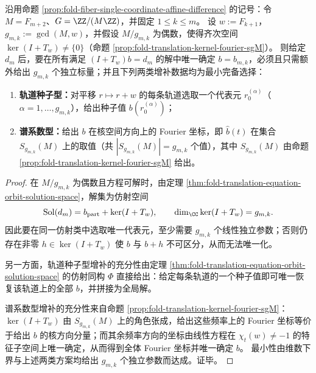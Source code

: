 \begin{proposition}[偶模长下单坐标统计的最小增补信息]\label{prop:fold-fiber-single-coordinate-minimal-augmentation}
沿用命题 \ref{prop:fold-fiber-single-coordinate-affine-difference} 的记号：令 \(M=F_{m+2}\)、\(G=\ZZ/(M\ZZ)\)，并固定 \(1\le k\le m\)。
设 \(w:=F_{k+1}\)，\(g_{m,k}:=\gcd(M,w)\)，并假设 \(M/g_{m,k}\) 为偶数，使得齐次空间 \(\ker(I+T_w)\neq\{0\}\)（命题 \ref{prop:fold-translation-kernel-fourier-sgM}）。
则给定 \(d_m\) 后，要在所有满足 \((I+T_w)b=d_m\) 的解中唯一确定 \(b=b_{m,k}\)，必须且只需额外给出 \(g_{m,k}\) 个独立标量；并且下列两类增补数据均为最小完备选择：
\begin{enumerate}
\normalfont
  \item \textbf{轨道种子型：}对平移 \(r\mapsto r+w\) 的每条轨道选取一个代表元 \(r_0^{(\alpha)}\)（\(\alpha=1,\dots,g_{m,k}\)），给出种子值 \(b(r_0^{(\alpha)})\)；
  \item \textbf{谱系数型：}给出 \(b\) 在核空间方向上的 Fourier 坐标，即 \(\widehat b(t)\) 在集合 \(S_{g_{m,k}}(M)\) 上的取值（共 \(|S_{g_{m,k}}(M)|=g_{m,k}\) 个值），其中 \(S_{g_{m,k}}(M)\) 由命题 \ref{prop:fold-translation-kernel-fourier-sgM} 给出。
\end{enumerate}
\end{proposition}

\begin{proof}
在 \(M/g_{m,k}\) 为偶数且方程可解时，由定理 \ref{thm:fold-translation-equation-orbit-solution-space}，解集为仿射空间
\[
\mathrm{Sol}(d_m)=b_{\mathrm{part}}+\ker(I+T_w),
\qquad
\dim_{\CC}\ker(I+T_w)=g_{m,k}.
\]
因此要在同一仿射类中选取唯一代表元，至少需要 \(g_{m,k}\) 个线性独立参数；否则仍存在非零 \(h\in\ker(I+T_w)\) 使 \(b\) 与 \(b+h\) 不可区分，从而无法唯一化。
\par
另一方面，轨道种子型增补的充分性由定理 \ref{thm:fold-translation-equation-orbit-solution-space} 的仿射同构 \(\Phi\) 直接给出：给定每条轨道的一个种子值即可唯一恢复该轨道上的全部 \(b\)，并拼接为全局解。
\par
谱系数型增补的充分性来自命题 \ref{prop:fold-translation-kernel-fourier-sgM}：\(\ker(I+T_w)\) 由 \(S_{g_{m,k}}(M)\) 上的角色张成，给出这些频率上的 Fourier 坐标等价于给出 \(b\) 的核方向分量；而其余频率方向的坐标由线性方程在 \(\chi_t(w)\neq -1\) 的特征子空间上唯一确定，从而得到全体 Fourier 坐标并唯一确定 \(b\)。
最小性由维数下界与上述两类方案均给出 \(g_{m,k}\) 个独立参数而达成。证毕。
\end{proof}

\endinput
